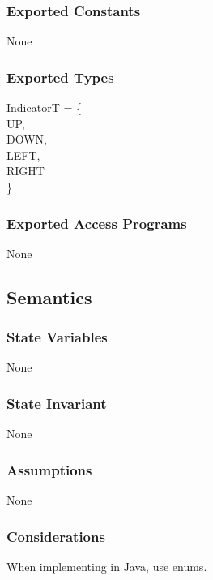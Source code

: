 \documentclass[12pt]{article}
\begin{document}
\subsubsection* {Exported Constants}

None

\subsubsection* {Exported Types}

IndicatorT = \{\\
    UP, \\
    DOWN, \\
    LEFT, \\
    RIGHT \\
\}

\subsubsection* {Exported Access Programs}

None

\subsection* {Semantics}

\subsubsection* {State Variables}

None

\subsubsection* {State Invariant}

None

\subsubsection* {Assumptions}

None

\subsubsection* {Considerations}

When implementing in Java, use enums.

\newpage

%
\end{document}
